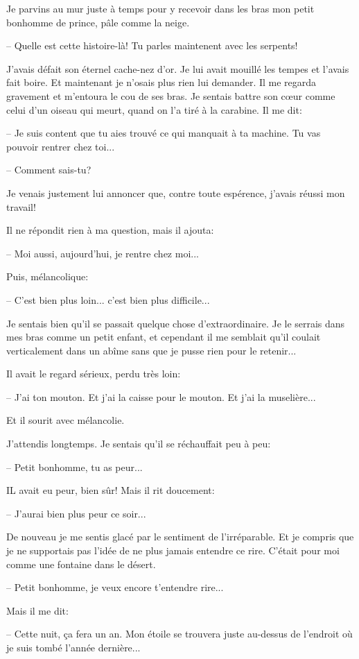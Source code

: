 \documentclass[a4paper]{report}
\begin{document}
Je parvins au mur juste à temps pour y recevoir dans les bras mon petit bonhomme de prince, pâle comme la neige.

-- Quelle est cette histoire-là! Tu parles maintenent avec les serpents!

J'avais défait son éternel cache-nez d'or. Je lui avait mouillé les tempes et l'avais fait boire. Et maintenant je n'osais plus rien lui demander. Il me regarda gravement et m'entoura le cou de ses bras. Je sentais battre son cœur comme celui d'un oiseau qui meurt, quand on l'a tiré à la carabine. Il me dit:

-- Je suis content que tu aies trouvé ce qui manquait à ta machine. Tu vas pouvoir rentrer chez toi...

-- Comment sais-tu?

Je venais justement lui annoncer que, contre toute espérence, j'avais réussi mon travail!

Il ne répondit rien à ma question, mais il ajouta:

-- Moi aussi, aujourd'hui, je rentre chez moi...

Puis, mélancolique:

-- C'est bien plus loin... c'est bien plus difficile...

Je sentais bien qu'il se passait quelque chose d'extraordinaire. Je le serrais dans mes bras comme un petit enfant, et cependant il me semblait qu'il coulait verticalement dans un abîme sans que je pusse rien pour le retenir...

Il avait le regard sérieux, perdu très loin:

-- J'ai ton mouton. Et j'ai la caisse pour le mouton. Et j'ai la muselière...

Et il sourit avec mélancolie.

J'attendis longtemps. Je sentais qu'il se réchauffait peu à peu:

-- Petit bonhomme, tu as peur...

IL avait eu peur, bien sûr! Mais il rit doucement:

-- J'aurai bien plus peur ce soir...

De nouveau je me sentis glacé par le sentiment de l'irréparable. Et je compris que je ne supportais pas l'idée de ne plus jamais entendre ce rire. C'était pour moi comme une fontaine dans le désert.

-- Petit bonhomme, je veux encore t'entendre rire...

Mais il me dit:

-- Cette nuit, ça fera un an. Mon étoile se trouvera juste au-dessus de l'endroit où je suis tombé l'année dernière...
\end{document}
